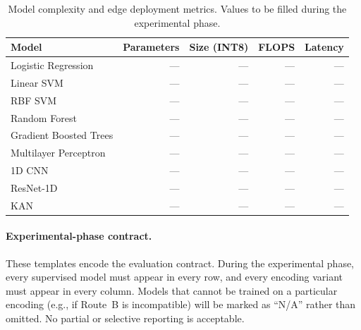 \begin{table}[htbp]
  \centering
  \caption{Model complexity and edge deployment metrics.
           Values to be filled during the experimental phase.}
  \label{tab:model_complexity}
  \begin{tabular}{l r r r r}
    \toprule
    \textbf{Model}
      & \textbf{Parameters}
      & \textbf{Size (INT8)}
      & \textbf{FLOPS}
      & \textbf{Latency} \\
    \midrule
    Logistic Regression    & --- & --- & --- & --- \\
    Linear SVM             & --- & --- & --- & --- \\
    RBF SVM                & --- & --- & --- & --- \\
    Random Forest          & --- & --- & --- & --- \\
    Gradient Boosted Trees & --- & --- & --- & --- \\
    Multilayer Perceptron  & --- & --- & --- & --- \\
    1D CNN                 & --- & --- & --- & --- \\
    ResNet-1D              & --- & --- & --- & --- \\
    KAN                    & --- & --- & --- & --- \\
    \bottomrule
  \end{tabular}
\end{table}

\paragraph{Experimental-phase contract.}
These templates encode the evaluation contract.  During the
experimental phase, every supervised model must appear in every row,
and every encoding variant must appear in every column.  Models that
cannot be trained on a particular encoding (e.g., if Route~B is
incompatible) will be marked as ``N/A'' rather than omitted.  No
partial or selective reporting is acceptable.
